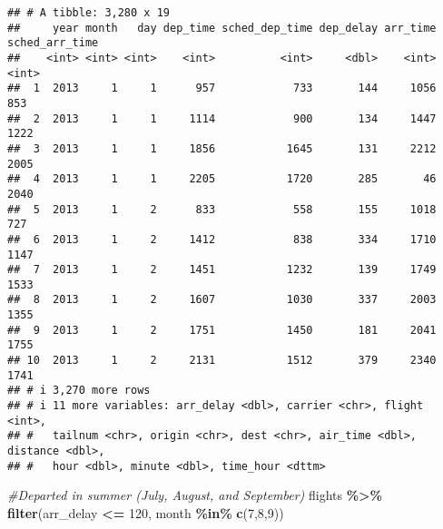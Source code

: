 \documentclass[
]{article}
\newenvironment{Shaded}{\begin{snugshade}}{\end{snugshade}}
\newcommand{\CommentTok}[1]{\textcolor[rgb]{0.56,0.35,0.01}{\textit{#1}}}
\newcommand{\DecValTok}[1]{\textcolor[rgb]{0.00,0.00,0.81}{#1}}
\newcommand{\FunctionTok}[1]{\textcolor[rgb]{0.13,0.29,0.53}{\textbf{#1}}}
\newcommand{\NormalTok}[1]{#1}
\newcommand{\SpecialCharTok}[1]{\textcolor[rgb]{0.81,0.36,0.00}{\textbf{#1}}}
\begin{document}
\begin{verbatim}
## # A tibble: 3,280 x 19
##     year month   day dep_time sched_dep_time dep_delay arr_time sched_arr_time
##    <int> <int> <int>    <int>          <int>     <dbl>    <int>          <int>
##  1  2013     1     1      957            733       144     1056            853
##  2  2013     1     1     1114            900       134     1447           1222
##  3  2013     1     1     1856           1645       131     2212           2005
##  4  2013     1     1     2205           1720       285       46           2040
##  5  2013     1     2      833            558       155     1018            727
##  6  2013     1     2     1412            838       334     1710           1147
##  7  2013     1     2     1451           1232       139     1749           1533
##  8  2013     1     2     1607           1030       337     2003           1355
##  9  2013     1     2     1751           1450       181     2041           1755
## 10  2013     1     2     2131           1512       379     2340           1741
## # i 3,270 more rows
## # i 11 more variables: arr_delay <dbl>, carrier <chr>, flight <int>,
## #   tailnum <chr>, origin <chr>, dest <chr>, air_time <dbl>, distance <dbl>,
## #   hour <dbl>, minute <dbl>, time_hour <dttm>
\end{verbatim}

\begin{Shaded}
\begin{Highlighting}[]
  \CommentTok{\#Departed in summer (July, August, and September)}
\NormalTok{  flights }\SpecialCharTok{\%\textgreater{}\%} \FunctionTok{filter}\NormalTok{(arr\_delay }\SpecialCharTok{\textless{}=} \DecValTok{120}\NormalTok{, month }\SpecialCharTok{\%in\%} \FunctionTok{c}\NormalTok{(}\DecValTok{7}\NormalTok{,}\DecValTok{8}\NormalTok{,}\DecValTok{9}\NormalTok{))}
\end{Highlighting}
\end{Shaded}
\end{document}
